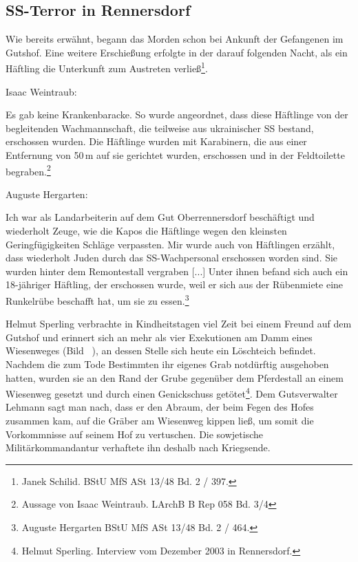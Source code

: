 \documentclass[a4paper,12pt,ngerman,
]{nisebook}
\begin{document}


\subsection{SS-Terror in Rennersdorf}

Wie bereits erwähnt, begann das Morden schon bei Ankunft der Gefangenen im Gutshof. Eine weitere Erschießung erfolgte in der darauf folgenden Nacht, als ein Häftling die Unterkunft zum Austreten verließ\footnote{Janek Schilid. BStU MfS ASt 13/48 Bd. 2 / 397.}. 

Isaac Weintraub:
\begin{leftbar} 
Es gab keine Krankenbaracke. So wurde angeordnet, dass diese Häftlinge von der begleitenden Wachmannschaft, die teilweise aus ukrainischer SS bestand, erschossen wurden. Die Häftlinge wurden mit Karabinern, die aus einer Entfernung von 50\,m auf sie gerichtet wurden, erschossen und in der Feldtoilette begraben.\footnote{Aussage von Isaac Weintraub. LArchB B Rep 058 Bd. 3/4}
\end{leftbar}
Auguste Hergarten: 
\begin{leftbar} 
Ich war als Landarbeiterin auf dem Gut Oberrennersdorf beschäftigt und wiederholt Zeuge, wie die Kapos die Häftlinge wegen den kleinsten Geringfügigkeiten Schläge verpassten. Mir wurde auch von Häftlingen erzählt, dass wiederholt Juden durch das SS-Wachpersonal erschossen worden sind. Sie wurden hinter dem Remontestall vergraben [...]
Unter ihnen befand sich auch ein 18-jähriger Häftling, der erschossen wurde, weil er sich aus der Rübenmiete eine Runkelrübe beschafft hat, um sie zu essen.\footnote{Auguste Hergarten BStU MfS ASt 13/48 Bd. 2 / 464.}
\end{leftbar}


Helmut Sperling verbrachte in Kindheitstagen viel Zeit bei einem Freund auf dem Gutshof und erinnert sich an mehr als vier Exekutionen am Damm eines Wiesenweges (Bild ~), an dessen Stelle sich heute ein Löschteich befindet. Nachdem die zum Tode Bestimmten ihr eigenes Grab notdürftig ausgehoben hatten, wurden sie an den Rand der Grube gegenüber dem Pferdestall an einem Wiesenweg gesetzt und durch einen Genickschuss getötet\footnote{Helmut Sperling. Interview vom Dezember 2003 in Rennersdorf.}. Dem Gutsverwalter Lehmann sagt man nach, dass er den Abraum, der beim Fegen des Hofes zusammen kam, auf die Gräber am Wiesenweg kippen ließ, um somit die Vorkommnisse auf seinem Hof zu vertuschen. Die sowjetische Militärkommandantur verhaftete ihn deshalb nach Kriegsende. 
\end{document}
